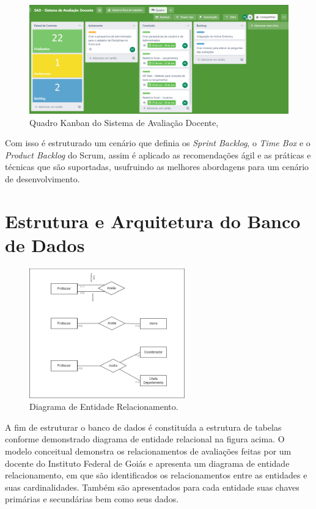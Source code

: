     \begin{figure}[h]
    \centering
    \includegraphics[width=1.0\textwidth]{./img/TrelloSad.png}
    \caption{Quadro Kanban do Sistema de Avaliação Docente,}
    \label{fig:TrelloSad}
    \end{figure}
    
    Com isso é estruturado um cenário que definia os \textit{Sprint Backlog}, o \textit{Time Box} e o \textit{Product Backlog} do Scrum, assim é aplicado as recomendações ágil e as práticas e técnicas que são suportadas, usufruindo as melhores abordagens para um cenário de desenvolvimento.

\section{Estrutura e Arquitetura do Banco de Dados}    

    \begin{figure}[h]
    \centering
    \includegraphics[width=0.60\textwidth]{./img/ModeloEntidadeRelacionamento.png}
    \caption{Diagrama de Entidade Relacionamento.}
    \label{fig:ModeloEntidadeRelacionamento}
    \end{figure}
    
    A fim de estruturar o banco de dados é constituída a estrutura de tabelas conforme demonstrado diagrama de entidade relacional na figura acima. O modelo conceitual demonstra os relacionamentos de avaliações feitas por um docente do Instituto Federal de Goiás e apresenta um diagrama de entidade relacionamento, em que são identificados os relacionamentos entre as entidades e suas cardinalidades. Também são apresentados para cada entidade suas chaves primárias e secundárias bem como seus dados.
    
